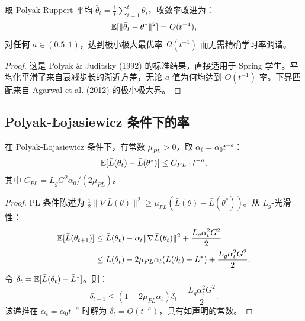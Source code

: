 \begin{corollary}\label{cor:polyak}
取 Polyak-Ruppert 平均 $\bar{\theta}_t = \frac{1}{t}\sum_{i=1}^t \theta_i$，收敛率改进为：
\begin{equation}
    \mathbb{E}[\|\bar{\theta}_t - \theta^*\|^2] = O(t^{-1}),
\end{equation}
对\textbf{任何} $a \in (0.5, 1)$，达到极小极大最优率 $\Omega(t^{-1})$ 而无需精确学习率调谐。
\end{corollary}

\begin{proof}
这是 Polyak \& Juditsky (1992) 的标准结果，直接适用于 Spring 学生。平均化平滑了来自衰减步长的渐近方差，无论 $a$ 值为何均达到 $O(t^{-1})$ 率。下界匹配来自 Agarwal et al. (2012) 的极小极大界。
\end{proof}

\subsection{Polyak-{\L}ojasiewicz 条件下的率}

\begin{theorem}[PL 条件下的学生率]\label{thm:rate-pl}
在 Polyak-{\L}ojasiewicz 条件下，有常数 $\mu_{PL} > 0$，取 $\alpha_t = \alpha_0 t^{-a}$：
\begin{equation}
    \mathbb{E}[\bar{L}(\theta_t) - \bar{L}(\theta^*)] \leq C_{PL} \cdot t^{-a},
\end{equation}
其中 $C_{PL} = L_g G^2 \alpha_0 / (2\mu_{PL})$。
\end{theorem}

\begin{proof}
PL 条件陈述为 $\frac{1}{2}\|\nabla \bar{L}(\theta)\|^2 \geq \mu_{PL} (\bar{L}(\theta) - \bar{L}(\theta^*))$。从 $L_g$-光滑性：
\begin{align}
    \mathbb{E}[\bar{L}(\theta_{t+1})] &\leq \bar{L}(\theta_t) - \alpha_t \|\nabla \bar{L}(\theta_t)\|^2 + \frac{L_g \alpha_t^2 G^2}{2} \\
    &\leq \bar{L}(\theta_t) - 2\mu_{PL}\alpha_t (\bar{L}(\theta_t) - \bar{L}^*) + \frac{L_g \alpha_t^2 G^2}{2}.
\end{align}
令 $\delta_t = \mathbb{E}[\bar{L}(\theta_t) - \bar{L}^*]$。则：
\begin{equation}
    \delta_{t+1} \leq (1 - 2\mu_{PL}\alpha_t) \delta_t + \frac{L_g \alpha_t^2 G^2}{2}.
\end{equation}
该递推在 $\alpha_t = \alpha_0 t^{-a}$ 时解为 $\delta_t = O(t^{-a})$，具有如声明的常数。
\end{proof}

